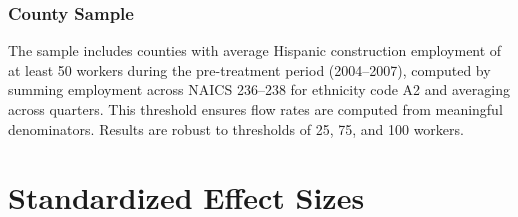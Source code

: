 \documentclass[12pt]{article}
\begin{document}
\subsubsection*{County Sample} The sample includes counties with average Hispanic construction employment of at least 50 workers during the pre-treatment period (2004--2007), computed by summing employment across NAICS 236--238 for ethnicity code A2 and averaging across quarters. This threshold ensures flow rates are computed from meaningful denominators. Results are robust to thresholds of 25, 75, and 100 workers.

\section{Standardized Effect Sizes}
\label{sec:sde}


\end{document}

